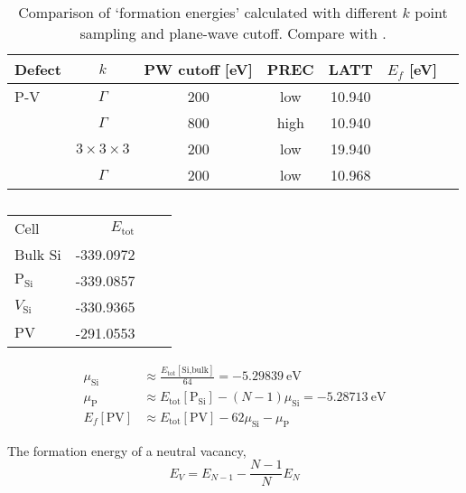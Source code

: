 \documentclass[11pt,bibliography=totoc,index=totoc]{scrbook}   %
\begin{document}
\begin{table}[htbp]
  \centering
  \begin{tabular}{lcccccc}\toprule
    Defect  & $k$                   & PW cutoff [eV]    & PREC  & LATT      & $E_f$ [eV]    \\\midrule
    P-V     & $\Gamma$              & 200               & low   & 10.940    &               \\
            & $\Gamma$              & 800               & high  & 10.940    &               \\
            & $3\times 3\times 3$   & 200               & low   & 19.940    &               \\
            & $\Gamma$              & 200               & low   & 10.968    &               \\\bottomrule
  \end{tabular}
  \caption{Comparison of `formation energies' calculated with different $k$ point sampling and 
  plane-wave cutoff. Compare with \cite[p. 3]{Sahli:2009}.}
\end{table}

\begin{table}[htbp]
  \centering
  \begin{tabular}{lrrr}
    Cell                        & $E_{\text{tot}}$  \\ 
    Bulk Si                     & -339.0972         \\
    $\text{P}_{\text{Si}}$      & -339.0857         \\
    $V_{\text{Si}}$             & -330.9365         \\
    $\text{PV}$                 & -291.0553         \\
  \end{tabular}
  \caption{}
\end{table}

\begin{align}
  \mu_{\text{Si}} &\approx \frac{E_{\text{tot}}[\text{Si,bulk}]}{64} = \SI{-5.29839}{\electronvolt} \\
  \mu_{\text{P}} &\approx E_{\text{tot}}[\text{P}_{\text{Si}}] - (N-1)\mu_{\text{Si}}
  = \SI{-5.28713}{\electronvolt}\\
  E_f[\text{PV}] &\approx E_{\text{tot}}[\text{PV}] - 62\mu_{\text{Si}} - \mu_{\text{P}}
\end{align}

The formation energy of a neutral vacancy,
\begin{equation}
  E_V = E_{N-1} - \frac{N-1}{N} E_N 
\end{equation}
\end{document}
